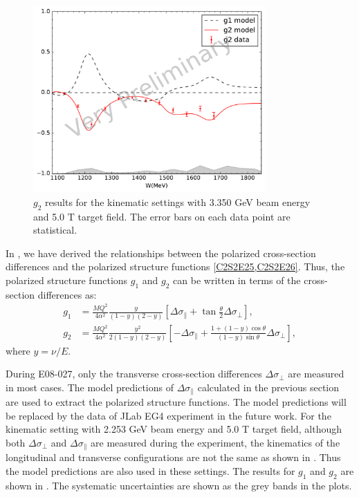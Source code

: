 \begin{figure}[tb!]
  \centering
  \includegraphics[width=0.79\textwidth]{figs/g1g2-model-33505090.pdf}
  \caption[$g_2$ results with $E=3.350$ GeV and $B=5.0$ T.]{$g_2$ results for the kinematic settings with 3.350 GeV beam energy and 5.0 T target field. The error bars on each data point are statistical. \label{C8S4F4}}
\end{figure}

In , we have derived the relationships between the polarized cross-section differences and the polarized structure functions \cref{C2S2E25,C2S2E26}. Thus, the polarized structure functions $g_1$ and $g_2$ can be written in terms of the cross-section differences as:
\begin{align} \label{C8S4E1}
g_1 & = \frac{MQ^2}{4\alpha^2}\frac{y}{(1-y)(2-y)}\left[\Delta\sigma_\parallel+\tan\frac{\theta}{2}\Delta\sigma_\perp\right], \\ \label{C8S4E2}
g_2 & = \frac{MQ^2}{4\alpha^2}\frac{y^2}{2(1-y)(2-y)}\left[-\Delta\sigma_\parallel+\frac{1+(1-y)\cos\theta}{(1-y)\sin\theta}\Delta\sigma_\perp\right],
\end{align}
where $y=\nu/E$.

During E08-027, only the transverse cross-section differences $\Delta\sigma_\perp$ are measured in most cases. The model predictions of $\Delta\sigma_\parallel$ calculated in the previous section are used to extract the polarized structure functions. The model predictions will be replaced by the data of JLab EG4 experiment in the future work. For the kinematic setting with 2.253 GeV beam energy and 5.0 T target field, although both $\Delta\sigma_\perp$ and $\Delta\sigma_\parallel$ are measured during the experiment, the kinematics of the longitudinal and transverse configurations are not the same as shown in . Thus the model predictions are also used in these settings. The results for $g_1$ and $g_2$ are shown in . The systematic uncertainties are shown as the grey bands in the plots.


